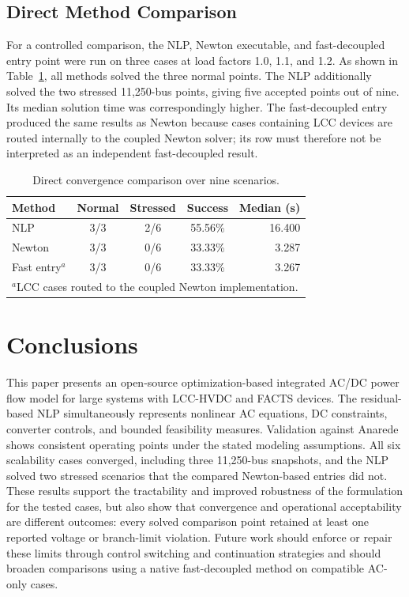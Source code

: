 \documentclass[letterpaper,journal]{IEEEtran}
\begin{document}
\subsection{Direct Method Comparison}

For a controlled comparison, the NLP, Newton executable, and fast-decoupled entry point were run on three cases at load factors 1.0, 1.1,
and 1.2. As shown in Table~\ref{tab:method_comparison}, all methods solved the three normal points. The NLP additionally solved the two
stressed 11,250-bus points, giving five accepted points out of nine. Its median solution time was correspondingly higher. The fast-decoupled
entry produced the same results as Newton because cases containing LCC devices are routed internally to the coupled Newton solver; its row
must therefore not be interpreted as an independent fast-decoupled result.

\begin{table}[!t]
\centering
\footnotesize
\caption{Direct convergence comparison over nine scenarios.}
\label{tab:method_comparison}
\setlength{\tabcolsep}{5pt}
\begin{tabular}{lcccr}
\hline
\textbf{Method} & \textbf{Normal} & \textbf{Stressed} & \textbf{Success} & \textbf{Median (s)} \\ \hline
NLP              & 3/3 & 2/6 & 55.56\% & 16.400 \\
Newton           & 3/3 & 0/6 & 33.33\% & 3.287 \\
Fast entry$^{a}$ & 3/3 & 0/6 & 33.33\% & 3.267 \\ \hline
\multicolumn{5}{l}{\scriptsize $^{a}$LCC cases routed to the coupled Newton implementation.}
\end{tabular}
\end{table}

\section{Conclusions}

This paper presents an open-source optimization-based integrated AC/DC power flow model for large systems with LCC-HVDC and FACTS devices.
The residual-based NLP simultaneously represents nonlinear AC equations, DC constraints, converter controls, and bounded feasibility measures.
Validation against Anarede shows consistent operating points under the stated modeling assumptions. All six scalability cases converged, including
three 11,250-bus snapshots, and the NLP solved two stressed scenarios that the compared Newton-based entries did not. These results support the
tractability and improved robustness of the formulation for the tested cases, but also show that convergence and operational acceptability are
different outcomes: every solved comparison point retained at least one reported voltage or branch-limit violation. Future work should enforce or
repair these limits through control switching and continuation strategies and should broaden comparisons using a native fast-decoupled method on
compatible AC-only cases.
\end{document}

